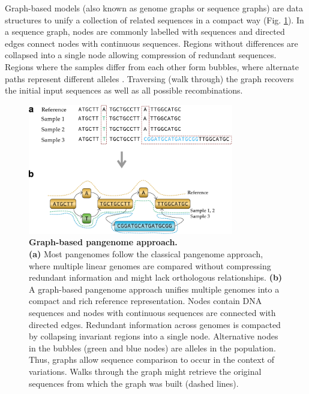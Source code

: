 \documentclass[../main.tex]{subfiles}
\begin{document}
Graph-based models (also known as genome graphs or sequence graphs) are data structures to unify a collection of related sequences in a compact way (Fig. \ref{fig14:graph}). In a sequence graph, nodes are commonly labelled with sequences and directed edges connect nodes with continuous sequences. Regions without differences are collapsed into a single node allowing compression of redundant sequences. Regions where the samples differ from each other form bubbles, where alternate paths represent different alleles \citep{paten2018superbubbles}. Traversing (walk through) the graph recovers the initial input sequences as well as all possible recombinations. \\


\begin{figure}[!htb]
    \centering
    \includegraphics[width=0.8\textwidth]{intro/fig41.pdf}
        \vspace{3mm}
        \caption[Graph-based pangenome approach]{\textbf{Graph-based pangenome approach.} \\
        \footnotesize{\textbf{(a)} Most pangenomes follow the classical pangenome approach, where multiple linear genomes are compared without compressing redundant information and might lack orthologous relationships. \textbf{(b)} A graph-based pangenome approach unifies multiple genomes into a compact and rich reference representation. Nodes contain DNA sequences and nodes with continuous sequences are connected with directed edges. Redundant information across genomes is compacted by collapsing invariant regions into a single node. Alternative nodes in the bubbles (green and blue nodes) are alleles in the population. Thus, graphs allow sequence comparison to occur in the context of variations. Walks through the graph might retrieve the original sequences from which the graph was built (dashed lines).}}
        \label{fig14:graph}
\end{figure}
\end{document}
